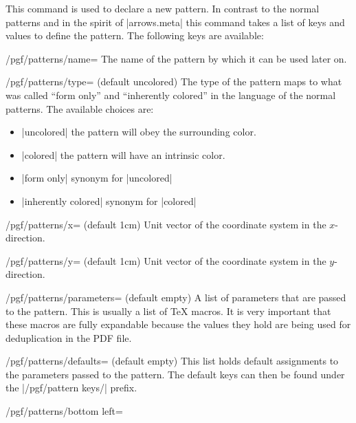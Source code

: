 \begin{command}{\pgfdeclarepattern{}}
    This command is used to declare a new pattern.  In contrast to the normal
    patterns and in the spirit of |arrows.meta| this command takes a list of
    keys and values to define the pattern.  The following keys are available:
\begin{key}{/pgf/patterns/name=}
    The name of the pattern by which it can be used later on.
\end{key}
\begin{key}{/pgf/patterns/type= (default uncolored)}
    The type of the pattern maps to what was called ``form only'' and ``inherently colored'' in the language of the normal patterns.
    The available choices are:
    \begin{itemize}
    \item |uncolored| the pattern will obey the surrounding color.
    \item |colored| the pattern will have an intrinsic color.
    \item |form only| synonym for |uncolored|
    \item |inherently colored| synonym for |colored|
    \end{itemize}
\end{key}
\begin{key}{/pgf/patterns/x= (default 1cm)}
    Unit vector of the coordinate system in the $x$-direction.
\end{key}
\begin{key}{/pgf/patterns/y= (default 1cm)}
    Unit vector of the coordinate system in the $y$-direction.
\end{key}
\begin{key}{/pgf/patterns/parameters= (default empty)}
    A list of parameters that are passed to the pattern.  This is usually a
    list of TeX macros.  It is very important that these macros are fully
    expandable because the values they hold are being used for deduplication in
    the PDF file.
\end{key}
\begin{key}{/pgf/patterns/defaults= (default empty)}
    This list holds default assignments to the parameters passed to the
    pattern.  The default keys can then be found under the |/pgf/pattern keys/|
    prefix.
\end{key}
\begin{key}{/pgf/patterns/bottom left=}

\end{key}
\end{command}
